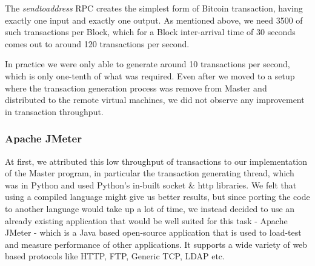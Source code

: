 
The \textit{sendtoaddress} RPC creates the simplest form of Bitcoin transaction, having exactly one input and exactly one output. As mentioned above, we need 3500 of such transactions per Block, which for a Block inter-arrival time of 30 seconds comes out to around 120 transactions per second.

In practice we were only able to generate around 10 transactions per second, which is only one-tenth of what was required. Even after we moved to a setup where the transaction generation process was remove from Master and distributed to the remote virtual machines, we did not observe any improvement in transaction throughput.

\subsubsection{Apache JMeter}

At first, we attributed this low throughput of transactions to our implementation of the Master program, in particular the transaction generating thread, which was in Python and used Python's in-built socket \& http libraries. We felt that using a compiled language might give us better results, but since porting the code to another language would take up a lot of time, we instead decided to use an already existing application that would be well suited for this task - Apache JMeter \cite{jmeter} - which is a Java based open-source application that is used to load-test and measure performance of other applications. It supports a wide variety of web based protocols like HTTP, FTP, Generic TCP, LDAP etc.

